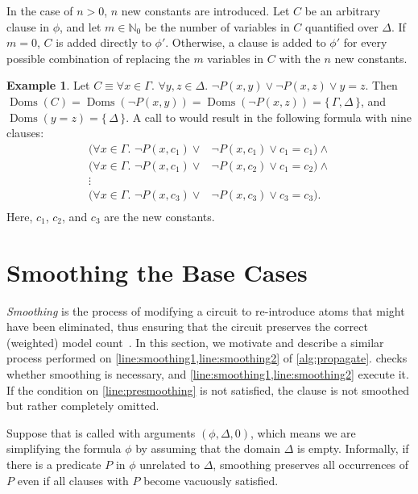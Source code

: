 \documentclass[letterpaper]{article} %
\theoremstyle{remark}
\theoremstyle{definition}
\newtheorem{example}{Example}
\DeclareMathOperator{\Doms}{Doms}
\begin{document}
In the case of $n>0$, $n$ new constants are introduced. Let $C$ be an arbitrary
clause in $\phi$, and let $m \in \mathbb{N}_{0}$ be the number of variables in
$C$ quantified over $\Delta$. If $m=0$, $C$ is added directly to $\phi'$.
Otherwise, a clause is added to $\phi'$ for every possible combination of
replacing the $m$ variables in $C$ with the $n$ new constants.

\begin{example}
  Let $C \equiv \forall x \in \Gamma\text{. }\forall y, z \in \Delta\text{.
  } \neg P(x, y) \lor \neg P(x, z) \lor y=z$. Then
  $\Doms(C) = \Doms(\neg P(x, y)) = \Doms(\neg P(x, z)) = \{\, \Gamma, \Delta \,\}$,
  and $\Doms(y=z) = \{\, \Delta \,\}$. A call to  would result in the following formula with nine clauses:
  \begin{align*}
    (\forall x \in \Gamma\text{. }\neg P(x, c_{1}) \lor& \neg P(x, c_{1}) \lor c_{1}=c_{1})\land{}\\
    (\forall x \in \Gamma\text{. }\neg P(x, c_{1}) \lor& \neg P(x, c_{2}) \lor c_{1}=c_{2})\land{}\\
    \vdots&\\
    (\forall x \in \Gamma\text{. }\neg P(x, c_{3}) \lor& \neg P(x, c_{3}) \lor c_{3}=c_{3}).\\
  \end{align*}
  Here, $c_{1}$, $c_{2}$, and $c_{3}$ are the new constants.
\end{example}

\section{Smoothing the Base Cases}\label{sec:smoothing}

\emph{Smoothing} is the process of modifying a circuit to re-introduce atoms
that might have been eliminated, thus ensuring that the circuit preserves the
correct (weighted) model
count~\cite{darwiche2001tractable,DBLP:conf/ijcai/BroeckTMDR11}. In this
section, we motivate and describe a similar process performed on
\cref{line:smoothing1,line:smoothing2} of \cref{alg:propagate}.
 checks whether smoothing is necessary, and
\cref{line:smoothing1,line:smoothing2} execute it. If the condition on
\cref{line:presmoothing} is not satisfied, the clause is not smoothed but rather
completely omitted.

Suppose that \Propagate is called with arguments $(\phi, \Delta, 0)$, which
means we are simplifying the formula $\phi$ by assuming that the domain $\Delta$
is empty. Informally, if there is a predicate $P$ in $\phi$ unrelated to
$\Delta$, smoothing preserves all occurrences of $P$ even if all clauses with
$P$ become vacuously satisfied.
\end{document}
